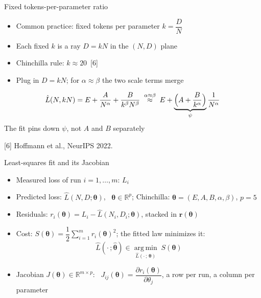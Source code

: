 \documentclass[aspectratio=169,11pt]{beamer}
\newcommand{\slidecite}[1]{\vfill{\tiny\color{gray}#1\par}}
\begin{document}
\begin{frame}{Fixed tokens-per-parameter ratio}
  \begin{itemize}\setlength{\itemsep}{14pt}
    \item Common practice: fixed tokens per parameter $k = \dfrac{D}{N}$
    \item Each fixed $k$ is a ray $D = kN$ in the $(N, D)$ plane
    \item Chinchilla rule: $k \approx 20$~[6]
    \item Plug in $D = kN$; for $\alpha \approx \beta$ the two scale terms merge
  \end{itemize}
  \[ \hat{L}(N, kN) = E + \dfrac{A}{N^{\alpha}} + \dfrac{B}{k^{\beta} N^{\beta}}
     \;\overset{\alpha \approx \beta}{\approx}\; E + \underbrace{\Bigl(A + \dfrac{B}{k^{\alpha}}\Bigr)}_{\psi} \dfrac{1}{N^{\alpha}} \]
  The fit pins down $\psi$, not $A$ and $B$ separately\par
  \slidecite{[6] Hoffmann et al., NeurIPS 2022.}
\end{frame}

\begin{frame}{Least-squares fit and its Jacobian}
  \begin{itemize}\setlength{\itemsep}{6pt}
    \item Measured loss of run $i = 1, \dots, m$: $L_i$
    \item Predicted loss: $\hat{L}(N, D; \boldsymbol{\theta})$, \ $\boldsymbol{\theta} \in \mathbb{R}^{p}$; Chinchilla: $\boldsymbol{\theta} = (E, A, B, \alpha, \beta)$, $p = 5$
    \item Residuals: $r_i(\boldsymbol{\theta}) = L_i - \hat{L}(N_i, D_i; \boldsymbol{\theta})$, stacked in $\mathbf{r}(\boldsymbol{\theta})$
    \item Cost: $S(\boldsymbol{\theta}) = \dfrac{1}{2} \sum_{i=1}^{m} r_i(\boldsymbol{\theta})^2$; the fitted law minimizes it:
      \[ \hat{L}(\cdot\,;\hat{\boldsymbol{\theta}}) \in \operatorname*{arg\,min}_{\hat{L}(\cdot\,;\,\boldsymbol{\theta})} \; S(\boldsymbol{\theta}) \]
    \item Jacobian $J(\boldsymbol{\theta}) \in \mathbb{R}^{m \times p}$: \ $J_{ij}(\boldsymbol{\theta}) = \dfrac{\partial r_i(\boldsymbol{\theta})}{\partial \theta_j}$, a row per run, a column per parameter
  \end{itemize}
\end{frame}
\end{document}

